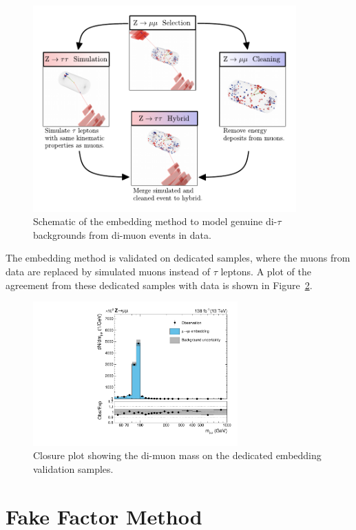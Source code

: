 \begin{figure}[!hbtp]
\centering
    \includegraphics[width=0.9\textwidth]{Figures/Embedding_Diagram.pdf}
\caption{Schematic of the embedding method to model genuine di-$\tau$ backgrounds from di-muon events in data.}
\label{fig:embedding}
\end{figure}

The embedding method is validated on dedicated samples, where the muons from data are replaced by simulated muons instead of $\tau$ leptons.
A plot of the agreement from these dedicated samples with data is shown in Figure~\ref{fig:emb_validation}.

\begin{figure}[!hbtp]
\centering
    \includegraphics[width=0.7\textwidth]{Figures/embedding_validation.pdf}
\caption{Closure plot showing the di-muon mass on the dedicated embedding validation samples.}
\label{fig:emb_validation}
\end{figure}

\section{Fake Factor Method}
\label{sec:ff}

